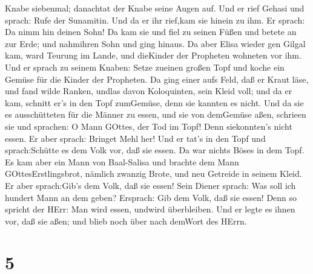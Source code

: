 Knabe siebenmal; danachtat der Knabe seine Augen auf.  Und
er rief Gehasi und sprach: Rufe der Sunamitin. Und da er ihr rief,kam
sie hinein zu ihm. Er sprach: Da nimm hin deinen Sohn!  Da
kam sie und fiel zu seinen Füßen und betete an zur Erde; und nahmihren
Sohn und ging hinaus.  Da aber Elisa wieder gen Gilgal kam,
ward Teurung im Lande, und dieKinder der Propheten wohneten vor ihm. Und
er sprach zu seinem Knaben: Setze zueinen großen Topf und koche ein
Gemüse für die Kinder der Propheten.  Da ging einer aufs
Feld, daß er Kraut läse, und fand wilde Ranken, undlas davon
Koloquinten, sein Kleid voll; und da er kam, schnitt er's in den Topf
zumGemüse, denn sie kannten es nicht.  Und da sie es
ausschütteten für die Männer zu essen, und sie von demGemüse aßen,
schrieen sie und sprachen: O Mann GOttes, der Tod im Topf! Denn
siekonnten's nicht essen.  Er aber sprach: Bringet Mehl
her! Und er tat's in den Topf und sprach:Schütte es dem Volk vor, daß
sie essen. Da war nichts Böses in dem Topf.  Es kam aber
ein Mann von Baal-Salisa und brachte dem Mann GOttesErstlingsbrot,
nämlich zwanzig Brote, und neu Getreide in seinem Kleid. Er aber
sprach:Gib's dem Volk, daß sie essen!  Sein Diener sprach:
Was soll ich hundert Mann an dem geben? Ersprach: Gib dem Volk, daß sie
essen! Denn so spricht der HErr: Man wird essen, undwird überbleiben.
 Und er legte es ihnen vor, daß sie aßen; und blieb noch
über nach demWort des HErrn.

\hypertarget{section-4}{%
\section{5}\label{section-4}}

